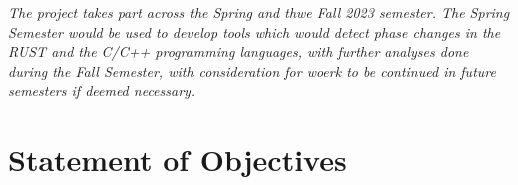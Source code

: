 \documentclass[11pt]{article}
\begin{document}
\textit{The project takes part across the Spring and thwe Fall 2023 semester. The Spring Semester would be used to develop tools which would detect phase changes in the RUST and the C/C++ programming languages, with further analyses done during the Fall Semester, with consideration for woerk to be continued in future semesters if deemed necessary.}

\section{Statement of Objectives}

\textit{}
\end{document}
